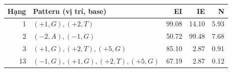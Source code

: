 \begin{tabular}{rp{}rrr}
\toprule
Hạng & Pattern (vị trí, base) & EI & IE & N \\
\midrule
1 & $(+1,G),\allowbreak (+2,T)$ & 99.08 & 14.10 & 5.93 \\
2 & $(-2,A),\allowbreak (-1,G)$ & 50.72 & 99.48 & 7.68 \\
3 & $(+1,G),\allowbreak (+2,T),\allowbreak (+5,G)$ & 85.10 & 2.87 & 0.91 \\
13 & $(-1,G),\allowbreak (+1,G),\allowbreak (+2,T),\allowbreak (+5,G)$ & 67.19 & 2.87 & 0.12 \\
\bottomrule
\end{tabular}
